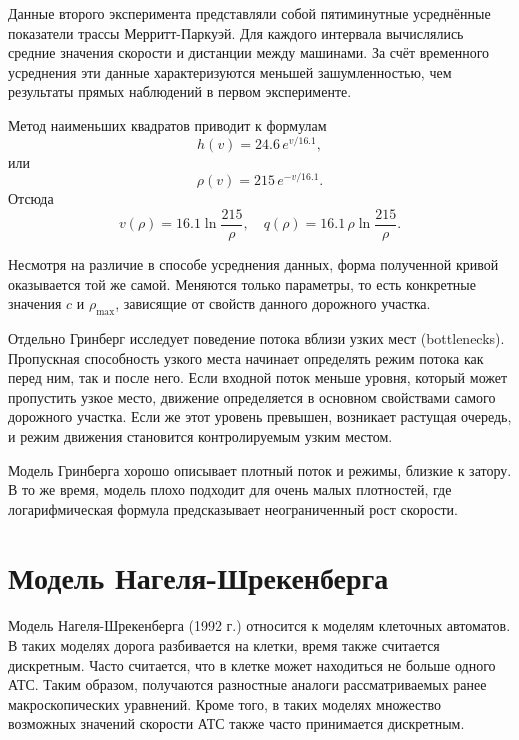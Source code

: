 \documentclass[12pt,a4paper]{article}
\begin{document}
Данные второго эксперимента представляли собой пятиминутные усреднённые показатели трассы Мерритт-Паркуэй. Для каждого интервала вычислялись средние значения скорости и дистанции между машинами. За счёт временного усреднения эти данные характеризуются меньшей зашумленностью, чем результаты прямых наблюдений в первом эксперименте.

Метод наименьших квадратов приводит к формулам
\begin{equation*}
h(v)=24.6\,e^{v/16.1},
\label{eq:merritt_h}
\end{equation*}
или
\begin{equation*}
\rho(v)=215\,e^{-v/16.1}.
\label{eq:merritt_rho}
\end{equation*}
Отсюда
\begin{equation*}
v(\rho)=16.1\ln\frac{215}{\rho},
\quad
q(\rho)=16.1\,\rho\ln\frac{215}{\rho}.
\label{eq:merritt_greenberg}
\end{equation*}

Несмотря на различие в способе усреднения данных, форма полученной кривой оказывается той же самой. Меняются только параметры, то есть конкретные значения \(c\) и \(\rho_{\max}\), зависящие от свойств данного дорожного участка.

Отдельно Гринберг исследует поведение потока вблизи узких мест (bottlenecks). Пропускная способность узкого места начинает определять режим потока как перед ним, так и после него. Если входной поток меньше уровня, который может пропустить узкое место, движение определяется в основном свойствами самого дорожного участка. Если же этот уровень превышен, возникает растущая очередь, и режим движения
становится контролируемым узким местом.

Модель Гринберга хорошо описывает плотный поток и режимы, близкие к затору. В то же время, модель плохо подходит для очень малых плотностей, где логарифмическая формула предсказывает неограниченный рост скорости.
\section{Модель Нагеля-Шрекенберга}
Модель Нагеля-Шрекенберга (1992 г.) относится к моделям клеточных автоматов. В таких моделях дорога разбивается на клетки, время также считается дискретным. Часто считается, что в клетке может находиться не больше одного АТС. Таким образом, получаются разностные аналоги рассматриваемых ранее макроскопических уравнений. Кроме того, в таких моделях множество возможных значений скорости АТС также часто принимается дискретным.
\end{document}
